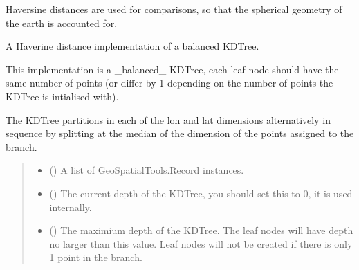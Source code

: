 \documentclass[letterpaper,10pt,english]{sphinxmanual}
\begin{document}
\sphinxAtStartPar
Haversine distances are used for comparisons, so that the spherical geometry
of the earth is accounted for.

\begin{fulllineitems}
\label{\detokenize{users_guide:GeoSpatialTools.kdtree.KDTree}}
\pysigstartsignatures
{}
\pysigstopsignatures
\sphinxAtStartPar
A Haverine distance implementation of a balanced KDTree.

\sphinxAtStartPar
This implementation is a \_balanced\_ KDTree, each leaf node should have the
same number of points (or differ by 1 depending on the number of points
the KDTree is intialised with).

\sphinxAtStartPar
The KDTree partitions in each of the lon and lat dimensions alternatively
in sequence by splitting at the median of the dimension of the points
assigned to the branch.
\begin{quote}\begin{description}
\begin{itemize}
\item {} 
\sphinxAtStartPar
{} (\sphinxstyleliteralemphasis{\sphinxupquote{{[}}}{\hyperref[\detokenize{users_guide:GeoSpatialTools.quadtree.Record}]{\sphinxcrossref{\sphinxstyleliteralemphasis{\sphinxupquote{Record}}}}}\sphinxstyleliteralemphasis{\sphinxupquote{{]}}}) \textendash{} A list of GeoSpatialTools.Record instances.

\item {} 
\sphinxAtStartPar
{} () \textendash{} The current depth of the KDTree, you should set this to 0, it is used
internally.

\item {} 
\sphinxAtStartPar
{} () \textendash{} The maximium depth of the KDTree. The leaf nodes will have depth no
larger than this value. Leaf nodes will not be created if there is
only 1 point in the branch.


\end{itemize}
\end{description}
\end{quote}
\end{fulllineitems}
\end{document}
